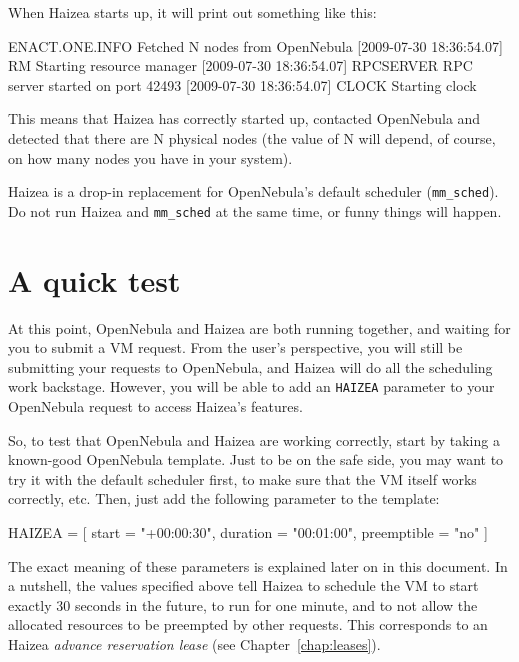 When Haizea starts up, it will print out something like this:

\begin{wideshellverbatim}
[2009-07-30 18:36:54.06] ENACT.ONE.INFO Fetched N nodes from OpenNebula
[2009-07-30 18:36:54.07] RM      Starting resource manager
[2009-07-30 18:36:54.07] RPCSERVER RPC server started on port 42493
[2009-07-30 18:36:54.07] CLOCK   Starting clock
\end{wideshellverbatim}

This means that Haizea has correctly started up, contacted OpenNebula and detected that there are N physical nodes (the value of N will depend, of course, on how many nodes you have in your system).

\begin{warning}
Haizea is a drop-in replacement for OpenNebula's default scheduler (\texttt{mm\_sched}). Do not run Haizea and \texttt{mm\_sched} at the same time, or funny things will happen.
\end{warning}

\section{A quick test}

At this point, OpenNebula and Haizea are both running together, and waiting for you to submit a VM request. From the user's perspective, you will still be submitting your requests to OpenNebula, and Haizea will do all the scheduling work backstage. However, you will be able to add an \texttt{HAIZEA} parameter to your OpenNebula request to access Haizea's features.

So, to test that OpenNebula and Haizea are working correctly, start by taking a known-good OpenNebula template. Just to be on the safe side, you may want to try it with the default scheduler first, to make sure that the VM itself works correctly, etc. Then, just add the following parameter to the template:

\begin{wideshellverbatim}
HAIZEA = [
  start        = "+00:00:30",
  duration     = "00:01:00",
  preemptible  = "no"
]
\end{wideshellverbatim}

The exact meaning of these parameters is explained later on in this document. In a nutshell, the values specified above tell Haizea to schedule the VM to start exactly 30 seconds in the future, to run for one minute, and to not allow the allocated resources to be preempted by other requests. This corresponds to an Haizea \emph{advance reservation lease} (see Chapter~\ref{chap:leases}).

